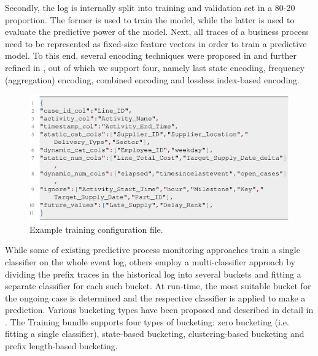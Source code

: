 \documentclass[runningheads,a4paper]{llncs}
\begin{document}

Secondly, the log is internally split into training and validation set in a 80-20 proportion. The former is used to train the model, while the latter is used to evaluate the predictive power of the model. Next, all traces of a business process need to be represented as fixed-size feature vectors in order to train a predictive model. To this end, several encoding techniques were proposed in \cite{Leontjeva2015} and further refined in \cite{Teinemaa2017}, out of which we support four, namely last state encoding, frequency (aggregation) encoding, combined encoding and lossless index-based encoding. 
\begin{figure}[htp!]%
	\centering
	 \includegraphics[width=.7\textwidth]{img/Listing}
	\caption{Example training configuration file.}
	\label{fig:listing}
	\vspace{-\baselineskip}
\end{figure}

While some of existing predictive process monitoring approaches train a single classifier on the whole event log, others employ a multi-classifier approach by dividing the prefix traces in the historical log into several buckets and fitting a separate classifier for each such bucket. At run-time, the most suitable bucket for the ongoing case is determined and the respective classifier is applied to make a prediction. Various bucketing types have been proposed and described in detail in \cite{Teinemaa2017}. The Training bundle supports four types of bucketing: zero bucketing (i.e. fitting a single classifier), state-based bucketing, clustering-based bucketing and prefix length-based bucketing.
\end{document}
